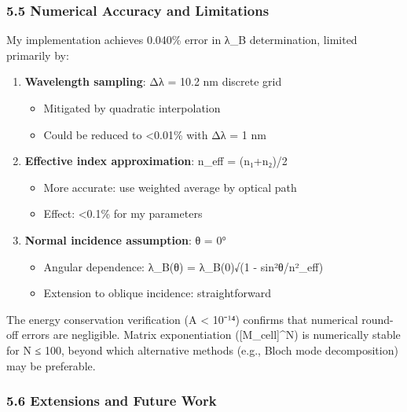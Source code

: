 \documentclass[
]{article}
\providecommand{\tightlist}{%
  \setlength{\itemsep}{0pt}\setlength{\parskip}{0pt}}
\begin{document}
\subsubsection{5.5 Numerical Accuracy and
Limitations}\label{numerical-accuracy-and-limitations}

My implementation achieves 0.040\% error in λ\_B determination, limited
primarily by:

\begin{enumerate}
\def\labelenumi{\arabic{enumi}.}
\tightlist
\item
  \textbf{Wavelength sampling}: Δλ = 10.2 nm discrete grid

  \begin{itemize}
  \tightlist
  \item
    Mitigated by quadratic interpolation
  \item
    Could be reduced to \textless0.01\% with Δλ = 1 nm
  \end{itemize}
\item
  \textbf{Effective index approximation}: n\_eff = (n₁+n₂)/2

  \begin{itemize}
  \tightlist
  \item
    More accurate: use weighted average by optical path
  \item
    Effect: \textless0.1\% for my parameters
  \end{itemize}
\item
  \textbf{Normal incidence assumption}: θ = 0°

  \begin{itemize}
  \tightlist
  \item
    Angular dependence: λ\_B(θ) = λ\_B(0)√(1 - sin²θ/n²\_eff)
  \item
    Extension to oblique incidence: straightforward
  \end{itemize}
\end{enumerate}

The energy conservation verification (\textbar A\textbar{} \textless{}
10⁻¹⁴) confirms that numerical round-off errors are negligible. Matrix
exponentiation ({[}M\_cell{]}\^{}N) is numerically stable for N ≤ 100,
beyond which alternative methods (e.g., Bloch mode decomposition) may be
preferable.

\subsubsection{5.6 Extensions and Future
Work}\label{extensions-and-future-work}
\end{document}
